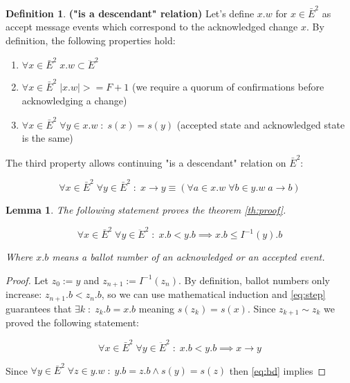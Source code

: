 \documentclass[12pt]{article}
\newtheorem{lemma}[theorem]{Lemma}
\theoremstyle{definition}
\newtheorem*{definition}{Definition}
\begin{document}
\begin{appendices}
\begin{definition}{\bf("is a descendant" relation)}
  Let's define $x.w$ for $x \in \bar{E}^2$ as accept message events which correspond to the acknowledged change $x$. By definition, the following properties hold:
  \begin{enumerate}
    \item $\forall x \in \bar{E}^2 \; x.w \subset \ddot{E}^2$
    \item $\forall x \in \bar{E}^2 \; |x.w| >= F+1$ (we require a quorum of confirmations before acknowledging a change)
    \item $\forall x \in \bar{E}^2 \; \forall y \in x.w \;:\; s(x) = s(y)$ (accepted state and acknowledged state is the same)
  \end{enumerate}
  
  The third property allows continuing "is a descendant" relation on $\bar{E}^2$:
  
  \begin{equation}
    \forall x \in \bar{E}^2 \; \forall y \in \bar{E}^2 \;:\; x \to y \equiv (\forall a \in x.w \; \forall b \in y.w \; a \to b)
  \end{equation}
\end{definition}

\begin{lemma}
  The following statement proves the theorem \ref{th:proof}.

  \begin{equation} \label{eq:step}
    \forall x \in \bar{E}^2 \; \forall y \in \ddot{E}^2 \;:\; x.b < y.b \implies x.b \leq I^{-1}(y).b
  \end{equation}

  Where $x.b$ means a ballot number of an acknowledged or an accepted event.
\end{lemma}

\begin{proof}
  Let $z_0 := y$ and $z_{n+1} := I^{-1}(z_{n})$. By definition, ballot numbers only increase: $z_{n+1}.b < z_{n}.b$, so we can use mathematical induction and \ref{eq:step} guarantees that $\exists k \;:\; z_k.b = x.b$ meaning $s(z_k) = s(x)$. Since $z_{k+1} \sim z_k$ we proved the following statement:

  \begin{equation} \label{eq:bd}
    \forall x \in \bar{E}^2 \; \forall y \in \ddot{E}^2 \;:\; x.b < y.b \implies x \to y
  \end{equation}

  Since $\forall y \in \bar{E}^2 \; \forall z \in y.w \;:\; y.b=z.b \land s(y)=s(z)$ then \ref{eq:bd} implies


\end{proof}
\end{appendices}
\end{document}
